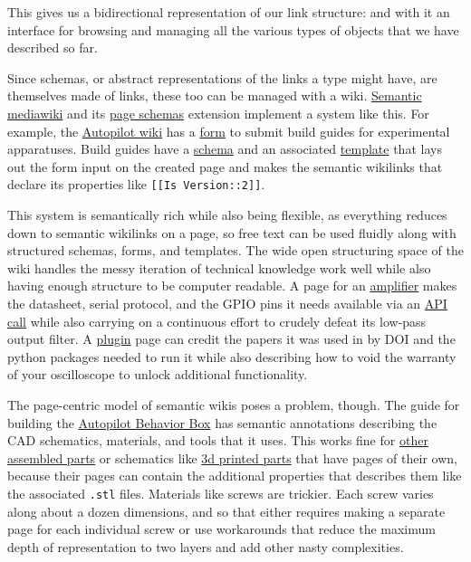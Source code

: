 This gives us a bidirectional representation of our link structure: and
with it an interface for browsing and managing all the various types of
objects that we have described so far.

Since schemas, or abstract representations of the links a type might
have, are themselves made of links, these too can be managed with a
wiki.
\href{https://www.semantic-mediawiki.org/wiki/Semantic_MediaWiki}{Semantic
mediawiki} and its
\href{https://www.mediawiki.org/wiki/Extension:Page_Schemas}{page
schemas} extension implement a system like this. For example, the
\href{https://wiki.auto-pi-lot.com}{Autopilot wiki} has a
\href{https://wiki.auto-pi-lot.com/index.php/Form:Build_Guide}{form} to
submit build guides for experimental apparatuses. Build guides have a
\href{https://wiki.auto-pi-lot.com/index.php/Category:Construction_Build_Guide}{schema}
and an associated
\href{https://wiki.auto-pi-lot.com/index.php/Template:Build_Guide}{template}
that lays out the form input on the created page and makes the semantic
wikilinks that declare its properties like
\texttt{{[}{[}Is\ Version::2{]}{]}}.

This system is semantically rich while also being flexible, as
everything reduces down to semantic wikilinks on a page, so free text
can be used fluidly along with structured schemas, forms, and templates.
The wide open structuring space of the wiki handles the messy iteration
of technical knowledge work well while also having enough structure to
be computer readable. A page for an
\href{https://wiki.auto-pi-lot.com/index.php/HiFiBerry_Amp2}{amplifier}
makes the datasheet, serial protocol, and the GPIO pins it needs
available via an
\href{https://www.semantic-mediawiki.org/wiki/Help:API}{API call} while
also carrying on a continuous effort to crudely defeat its low-pass
output filter. A
\href{https://wiki.auto-pi-lot.com/index.php/Plugin:Autopilot_Paper}{plugin}
page can credit the papers it was used in by DOI and the python packages
needed to run it while also describing how to void the warranty of your
oscilloscope to unlock additional functionality.

The page-centric model of semantic wikis poses a problem, though. The
guide for building the
\href{https://wiki.auto-pi-lot.com/index.php/Autopilot_Behavior_Box}{Autopilot
Behavior Box} has semantic annotations describing the CAD schematics,
materials, and tools that it uses. This works fine for
\href{https://wiki.auto-pi-lot.com/index.php/Autopilot_Tripoke}{other
assembled parts} or schematics like
\href{https://wiki.auto-pi-lot.com/index.php/Autopilot_Nosepoke_Cap}{3d
printed parts} that have pages of their own, because their pages can
contain the additional properties that describes them like the
associated \texttt{.stl} files. Materials like screws are trickier. Each
screw varies along about a dozen dimensions, and so that either requires
making a separate page for each individual screw or use
workarounds that reduce the maximum depth of representation to two layers
and add other nasty complexities.

